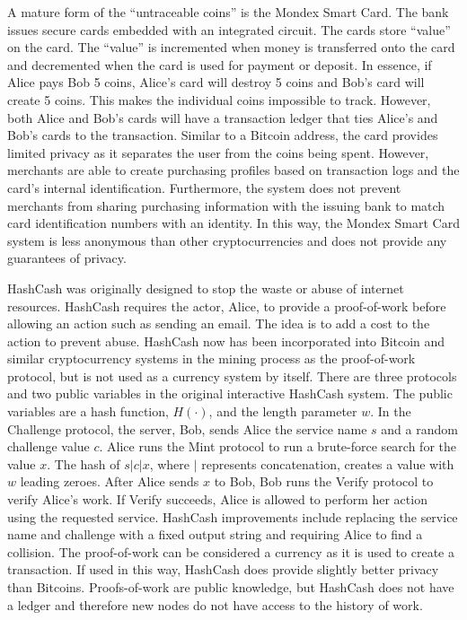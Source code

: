 A mature form of the “untraceable coins” is the Mondex Smart Card. The bank issues secure cards embedded with an integrated circuit. The cards store “value” on the card. The “value” is incremented when money is transferred onto the card and decremented when the card is used for payment or deposit. In essence, if Alice pays Bob 5 coins, Alice’s card will destroy 5 coins and Bob’s card will create 5 coins. This makes the individual coins impossible to track. However, both Alice and Bob’s cards will have a transaction ledger that ties Alice’s and Bob’s cards to the transaction. Similar to a Bitcoin address, the card provides limited privacy as it separates the user from the coins being spent. However, merchants are able to create purchasing profiles based on transaction logs and the card’s internal identification. Furthermore, the system does not prevent merchants from sharing purchasing information with the issuing bank to match card identification numbers with an identity. In this way, the Mondex Smart Card system is less anonymous than other cryptocurrencies and does not provide any guarantees of privacy.

HashCash was originally designed to stop the waste or abuse of internet resources. HashCash requires the actor, Alice, to provide a proof-of-work before allowing an action such as sending an email. The idea is to add a cost to the action to prevent abuse. HashCash now has been incorporated into Bitcoin and similar cryptocurrency systems in the mining process as the proof-of-work protocol, but is not used as a currency system by itself. There are three protocols and two public variables in the original interactive HashCash system. The public variables are a hash function, $H(\cdot)$, and the length parameter $w$. In the Challenge protocol, the server, Bob, sends Alice the service name $s$ and a random challenge value $c$. Alice runs the Mint protocol to run a brute-force search for the value $x$. The hash of $s|c|x$, where $|$ represents concatenation, creates a value with $w$ leading zeroes. After Alice sends $x$ to Bob, Bob runs the Verify protocol to verify Alice’s work. If Verify succeeds, Alice is allowed to perform her action using the requested service. HashCash improvements include replacing the service name and challenge with a fixed output string and requiring Alice to find a collision. The proof-of-work can be considered a currency as it is used to create a transaction. If used in this way, HashCash does provide slightly better privacy than Bitcoins. Proofs-of-work are public knowledge, but HashCash does not have a ledger and therefore new nodes do not have access to the history of work.


